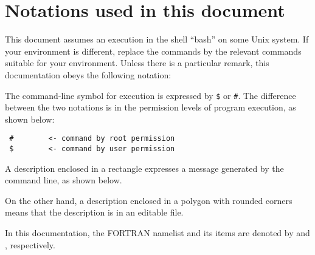 \section{Notations used in this document} \label{sec:notation}

This document assumes an execution in the shell ``bash'' on some Unix system.
If your environment is different, replace the commands
by the relevant commands suitable for your environment.
Unless there is a particular remark, this documentation obeys the following notation:

The command-line symbol for execution is expressed by \verb|$| or \verb|#|.
The difference between the two notations is 
in the permission levels of program execution, as shown below:
\begin{verbatim}
 #        <- command by root permission
 $        <- command by user permission
\end{verbatim}

A description enclosed in a rectangle expresses a message generated by the command line, as shown below.

On the other hand, a description enclosed in a polygon with rounded corners means that the description is in an editable file.

In this documentation, the FORTRAN namelist and its items are denoted by
 and , respectively.

